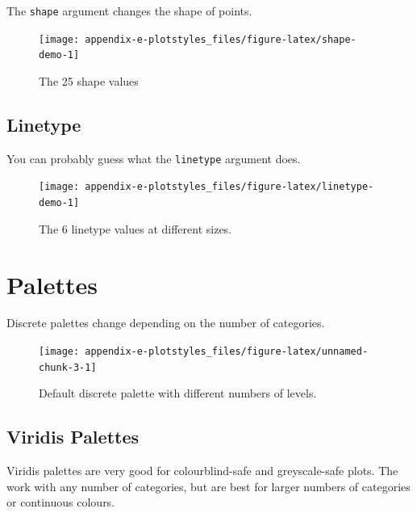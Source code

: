 \documentclass[
  oneside]{book}
\begin{document}
The \texttt{shape} argument changes the shape of points.

\begin{figure}

{\centering \texttt{[image: appendix-e-plotstyles\_files/figure-latex/shape-demo-1]} 

}

\caption{The 25 shape values}\label{fig:shape-demo}
\end{figure}

\hypertarget{linetype}{%
\subsection{Linetype}\label{linetype}}

You can probably guess what the \texttt{linetype} argument does.

\begin{figure}

{\centering \texttt{[image: appendix-e-plotstyles\_files/figure-latex/linetype-demo-1]} 

}

\caption{The 6 linetype values at different sizes.}\label{fig:linetype-demo}
\end{figure}

\hypertarget{palettes}{%
\section{Palettes}\label{palettes}}

Discrete palettes change depending on the number of categories.

\begin{figure}

{\centering \texttt{[image: appendix-e-plotstyles\_files/figure-latex/unnamed-chunk-3-1]} 

}

\caption{Default discrete palette with different numbers of levels.}\label{fig:unnamed-chunk-3}
\end{figure}

\hypertarget{viridis-palettes}{%
\subsection{Viridis Palettes}\label{viridis-palettes}}

Viridis palettes are very good for colourblind-safe and greyscale-safe plots. The work with any number of categories, but are best for larger numbers of categories or continuous colours.
\end{document}
